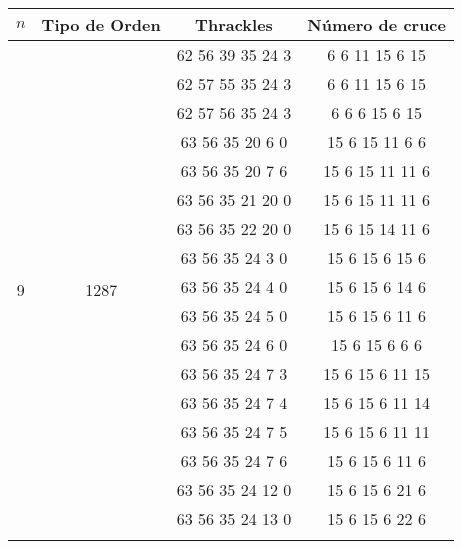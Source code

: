   \begin{tabular}[t]{|c|c|c|c|}

    \hline
    $n$                 &Tipo de Orden        & Thrackles          & Número de cruce  \\ \hline\hline
    \multirow{25}{*}{9} &\multirow{25}{*}{1287}& 62 56 39 35 24 3  & 6 6 11 15 6 15   \\ \cline{3-3}
                        &                     & 62 57 55 35 24 3   & 6 6 11 15 6 15  \\ \cline{3-3}
                        &                     & 62 57 56 35 24 3   & 6 6 6 15 6 15  \\ \cline{3-3}
                        &                     & 63 56 35 20 6 0    & 15 6 15 11 6 6 \\ \cline{3-3}
                        &                     & 63 56 35 20 7 6    & 15 6 15 11 11 6 \\ \cline{3-3}
                        &                     & 63 56 35 21 20 0   & 15 6 15 11 11 6  \\ \cline{3-3}
                        &                     & 63 56 35 22 20 0   & 15 6 15 14 11 6  \\ \cline{3-3}
                        &                     & 63 56 35 24 3 0    & 15 6 15 6 15 6 \\ \cline{3-3}
                        &                     & 63 56 35 24 4 0    & 15 6 15 6 14 6 \\ \cline{3-3}
                        &                     & 63 56 35 24 5 0    & 15 6 15 6 11 6 \\ \cline{3-3}
                        &                     & 63 56 35 24 6 0    & 15 6 15 6 6 6 \\ \cline{3-3}
                        &                     & 63 56 35 24 7 3    & 15 6 15 6 11 15 \\ \cline{3-3}
                        &                     & 63 56 35 24 7 4    & 15 6 15 6 11 14 \\ \cline{3-3}
                        &                     & 63 56 35 24 7 5    & 15 6 15 6 11 11 \\ \cline{3-3}
                        &                     & 63 56 35 24 7 6    & 15 6 15 6 11 6 \\ \cline{3-3}
                        &                     & 63 56 35 24 12 0   & 15 6 15 6 21 6  \\ \cline{3-3}
                        &                     & 63 56 35 24 13 0   & 15 6 15 6 22 6  \\ \cline{3-3}

\end{tabular}
